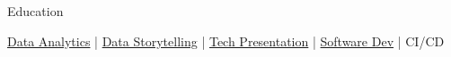 \documentclass{resume/resume}
\begin{document}
\begin{rSection}{Education}
\begin{adjustwidth}{6em}{0pt}
  \href{https://databricks.com/blog/2022/07/14/using-spark-structured-streaming-to-scale-your-analytics.html}{Data Analytics} | 
  \href{https://spelkington.github.io/assets/utah_office_update.pdf#page=17}{Data Storytelling} |  %
  \href{https://www.youtube.com/watch?v=lMFQp3wN-cg}{Tech Presentation} |
  \href{https://github.com/spelkington}{Software Dev} |
  CI/CD
  
\end{adjustwidth}



\end{rSection}
\end{document}
